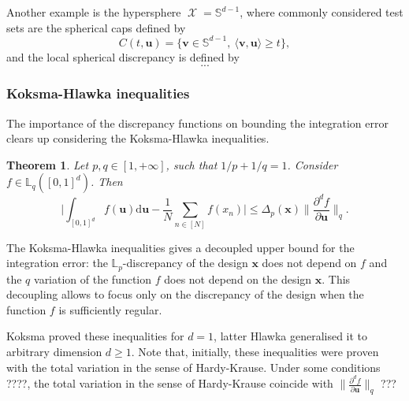 \documentclass[twoside,11pt]{book}
\newtheorem{theorem}{Theorem}
\DeclareMathOperator{\X}{\mathcal{X}}
\begin{document}
Another example is the hypersphere $\X = \mathbb{S}^{d-1}$, where commonly considered test sets are the spherical caps defined by
\begin{equation}
C(t,\bm{u}) = \{ \bm{v} \in \mathbb{S}^{d-1}, \: \langle \bm{v}, \bm{u} \rangle \geq t\},
\end{equation}
and the local spherical discrepancy is defined by
\begin{equation}
...
\end{equation}
\subsubsection{Koksma-Hlawka inequalities}
The importance of the discrepancy functions on bounding the integration error clears up considering the Koksma-Hlawka inequalities.

\begin{theorem}\label{thm:KH_ineq}
Let $p,q \in [1,+\infty]$, such that $1/p+1/q = 1$. Consider $f \in \mathbb{L}_{q}([0,1]^{d})$. Then 
\begin{equation}\label{eq:KH_ineq}
\bigg| \int_{[0,1]^{d}} f(\bm{u}) \mathrm{d}\bm{u} - \frac{1}{N} \sum\limits_{n \in [N]}  f(x_{n})\bigg| \leq \Delta_{p}(\bm{x}) \|\frac{\partial^{d} f}{\partial \bm{u}}\|_{q}.
\end{equation}
\end{theorem}
The Koksma-Hlawka inequalities gives a decoupled upper bound for the integration error: the $\mathbb{L}_{p}$-discrepancy of the design $\bm{x}$ does not depend on $f$ and the $q$ variation of the function $f$ does not depend on the design $\bm{x}$. This decoupling allows to focus only on the discrepancy of the design when the function $f$ is sufficiently regular.

Koksma proved these inequalities for $d=1$, latter Hlawka generalised it to arbitrary dimension $d \geq 1$. Note that, initially, these inequalities were proven with the total variation in the sense of Hardy-Krause. Under some conditions ????, the total variation in the sense of Hardy-Krause coincide with $\|\frac{\partial^{d} f}{\partial \bm{u}}\|_{q}$ ??? 
\end{document}
